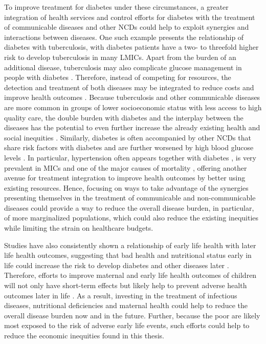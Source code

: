 To improve treatment for diabetes under these circumstances, a greater integration of health services and control efforts for diabetes with the treatment of communicable diseases and other \acp{NCD} could help to exploit synergies and interactions between diseases. One such example presents the relationship of diabetes with tuberculosis, with diabetes patients have a two- to threefold higher risk to develop tuberculosis in many \acp{LMIC}. Apart from the burden of an additional disease, tuberculosis may also complicate glucose management in people with diabetes \parencite{Dooley2009}. Therefore, instead of competing for resources, the detection and treatment of both diseases may be integrated to reduce costs and improve health outcomes \parencite{Marais2013,Remais2013}. Because tuberculosis and other communicable diseases are more common in groups of lower socioeconomic status with less access to high quality care, the double burden with diabetes and the interplay between the diseases has the potential to even further increase the already existing health and social inequities \parencite{Marais2013}.  Similarly, diabetes is often accompanied by other \acp{NCD} that share risk factors with diabetes and are further worsened by high blood glucose levels \parencite{Cheung2012}. In particular, hypertension often appears together with diabetes \parencite{Cheung2012,Barquera2013}, is very prevalent in \acp{MIC} and one of the major causes of mortality \parencite{Mills2016}, offering another avenue for treatment integration to improve health outcomes by better using existing resources. Hence, focusing on ways to take advantage of the synergies presenting themselves in the treatment of communicable and non-communicable diseases could provide a way to reduce the overall disease burden, in particular, of more marginalized populations, which could also reduce the existing inequities while limiting the strain on healthcare budgets.

Studies have also consistently shown a relationship of early life health with later life health outcomes, suggesting that bad health and nutritional status early in life could increase the risk to develop diabetes and other diseases later  \parencite{Currie2013,Hanson2012}. Therefore, efforts to improve maternal and early life health outcomes of children will not only have short-term effects but likely help to prevent adverse health outcomes later in life \parencite{Marais2013,Bygbjerg2012}. As a result, investing in the treatment of infectious diseases, nutritional deficiencies and maternal health could help to reduce the overall disease burden now and in the future. Further, because the poor are likely most exposed to the risk of adverse early life events, such efforts could help to reduce the economic inequities found in this thesis.  


